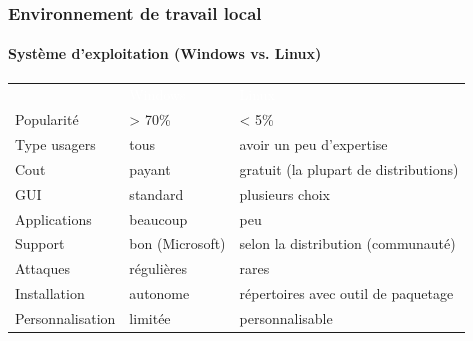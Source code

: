 \documentclass[xcolor=table]{beamer}
\begin{document}
\begin{frame}
\frametitle{Environnement de travail local}
\framesubtitle{Système d'exploitation (Windows vs. Linux)}

	
\begin{tabular}{p{}p{}p{}}
	\rowcolor{darkblue}
	& \textcolor{white}{Windows} & \textcolor{white}{Linux} \\
	
	Popularité & > 70\% & < 5\% \\
	
	Type usagers & tous & avoir un peu d'expertise \\
	
	Cout & payant & gratuit (la plupart de distributions) \\
	
	GUI & standard & plusieurs choix \\
	
	Applications & beaucoup & peu\\
	
	Support & bon (Microsoft) & selon la distribution (communauté) \\
	
	Attaques & régulières & rares\\
	
	Installation & autonome & répertoires avec outil de paquetage \\
	
	Personnalisation & limitée & personnalisable \\
\end{tabular}

\end{frame}
\end{document}
